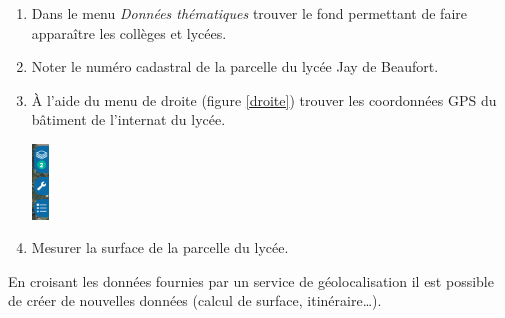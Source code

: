 \documentclass[a4paper,11pt]{article}
\begin{document}
\begin{activite}
\begin{enumerate}
    \item Dans le menu \emph{Données thématiques} trouver le fond permettant de faire apparaître les collèges et lycées.
    \item Noter le numéro cadastral de la parcelle du lycée Jay de Beaufort.
    \item À l'aide du menu de droite (figure \ref{droite}) trouver les coordonnées GPS du bâtiment de l'internat du lycée.
    \begin{center}
    \centering
    \includegraphics[height=2cm]{ressources/droite.png}
    \label{droite}
    \end{center}
    \item Mesurer la surface de la parcelle du lycée.
\end{enumerate}
\end{activite}
\begin{aretenir}[]
En croisant les données fournies par un service de géolocalisation il est possible de créer de nouvelles données (calcul de surface, itinéraire\dots).
\end{aretenir}
\end{document}
